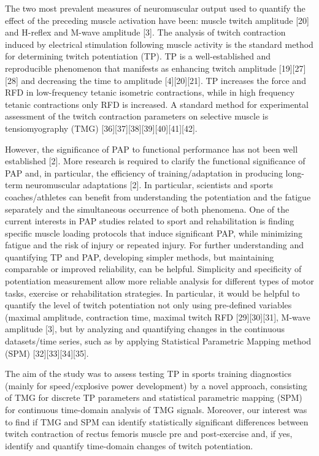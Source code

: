 \documentclass[utf8]{style/FrontiersinHarvard}
\begin{document}
The two most prevalent measures of neuromuscular output used to quantify the effect of the preceding muscle activation have been: muscle twitch amplitude [20] and H-reflex and M-wave amplitude [3].
The analysis of twitch contraction induced by electrical stimulation following muscle activity is the standard method for determining twitch potentiation (TP).
TP is a well-established and reproducible phenomenon that manifests as enhancing twitch amplitude [19][27][28] and decreasing the time to amplitude [4][20][21].
TP increases the force and RFD in low-frequency tetanic isometric contractions, while in high frequency tetanic contractions only RFD is increased.
A standard method for experimental assessment of the twitch contraction parameters on selective muscle is tensiomyography (TMG) [36][37][38][39][40][41][42].

However, the significance of PAP to functional performance has not been well established [2].
More research is required to clarify the functional significance of PAP and, in particular, the efficiency of training/adaptation in producing long-term neuromuscular adaptations [2].
In particular, scientists and sports coaches/athletes can benefit from understanding the potentiation and the fatigue separately and the simultaneous occurrence of both phenomena.
One of the current interests in PAP studies related to sport and rehabilitation is finding specific muscle loading protocols that induce significant PAP, while minimizing fatigue and the risk of injury or repeated injury.
For further understanding and quantifying TP and PAP, developing simpler methods, but maintaining comparable or improved reliability, can be helpful.
Simplicity and specificity of potentiation measurement allow more reliable analysis for different types of motor tasks, exercise or rehabilitation strategies.
In particular, it would be helpful to quantify the level of twitch potentiation not only using pre-defined variables (maximal amplitude, contraction time, maximal twitch RFD [29][30][31], M-wave amplitude [3], but by analyzing and quantifying changes in the continuous datasets/time series, such as by applying Statistical Parametric Mapping method (SPM) [32][33][34][35].

The aim of the study was to assess testing TP in sports training diagnostics (mainly for speed/explosive power development) by a novel approach, consisting of TMG for discrete TP parameters and statistical parametric mapping (SPM) for continuous time-domain analysis of TMG signals.
Moreover, our interest was to find if TMG and SPM can identify statistically significant differences between twitch contraction of rectus femoris muscle pre and post-exercise and, if yes, identify and quantify time-domain changes of twitch potentiation.
\end{document}
